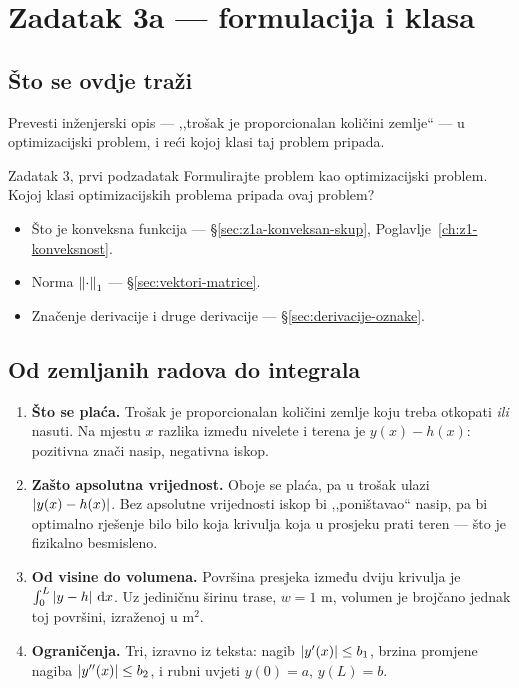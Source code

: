 \chapter{Zadatak 3a --- formulacija i klasa}
\label{ch:z3-formulacija}

\section{Što se ovdje traži}

Prevesti inženjerski opis --- ,,trošak je proporcionalan količini zemlje`` --- u
optimizacijski problem, i reći kojoj klasi taj problem pripada.

\begin{zadatak}{Zadatak 3, prvi podzadatak}
Formulirajte problem kao optimizacijski problem. Kojoj klasi optimizacijskih
problema pripada ovaj problem?
\end{zadatak}

\begin{predznanje}
\begin{itemize}[nosep,leftmargin=*]
  \item Što je konveksna funkcija --- \S\ref{sec:z1a-konveksan-skup}, Poglavlje~\ref{ch:z1-konveksnost}.
  \item Norma $\left\lVert \cdot \right\rVert_1$ --- \S\ref{sec:vektori-matrice}.
  \item Značenje derivacije i druge derivacije --- \S\ref{sec:derivacije-oznake}.
\end{itemize}
\end{predznanje}

\section{Od zemljanih radova do integrala}
\label{sec:z3-model}

\begin{korak}
\begin{enumerate}[leftmargin=*]
  \item \textbf{Što se plaća.} Trošak je proporcionalan količini zemlje koju
        treba otkopati \emph{ili} nasuti. Na mjestu $x$ razlika između nivelete i
        terena je $y(x) - h(x)$: pozitivna znači nasip, negativna iskop.
  \item \textbf{Zašto apsolutna vrijednost.} Oboje se plaća, pa u trošak ulazi
        $\left\lvert y(x) - h(x) \right\rvert$. Bez apsolutne vrijednosti iskop bi ,,poništavao``
        nasip, pa bi optimalno rješenje bilo bilo koja krivulja koja u prosjeku
        prati teren --- što je fizikalno besmisleno.
  \item \textbf{Od visine do volumena.} Površina presjeka između dviju krivulja
        je $\int_0^L \left\lvert y - h \right\rvert\,\mathrm{d} x$. Uz jediničnu širinu trase, $w = 1$ m,
        volumen je brojčano jednak toj površini, izraženoj u $\mathrm{m}^2$.
  \item \textbf{Ograničenja.} Tri, izravno iz teksta: nagib
        $\left\lvert y'(x) \right\rvert \leq b_1$, brzina promjene nagiba $\left\lvert y''(x) \right\rvert \leq b_2$, i
        rubni uvjeti $y(0) = a$, $y(L) = b$.
\end{enumerate}
\end{korak}

